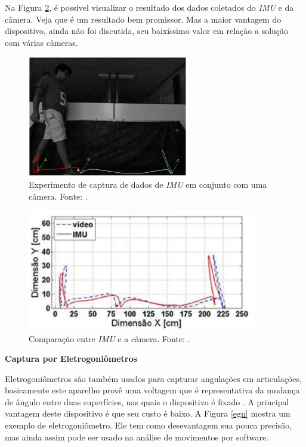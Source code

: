 Na Figura \ref{imu2}, é possível visualizar o resultado dos dados coletados do \emph{IMU} e da câmera. 
Veja que é um resultado bem promissor. 
Mas a maior vantagem do dispositivo, ainda não foi discutida, seu baixíssimo valor em relação a solução com várias câmeras.

\begin{figure}[H]
	\centering
	\includegraphics[width=7cm]{figuras/imu.eps}
	\caption{Experimento de captura de dados de \emph{IMU} em conjunto com uma câmera. Fonte: \cite{Leite2014}.}
	\label{imu}
	
\end{figure}


\begin{figure}[H]
	\centering
	\includegraphics[width=10cm]{figuras/imu2.eps}
	\caption{Comparação entre \emph{IMU} e a câmera. Fonte: \cite{Leite2014}.}
	\label{imu2}
	
\end{figure}



\textbf{Captura por Eletrogoniômetros}

\noindent
Eletrogoniômetros são também usados para capturar angulações em articulações, basicamente este aparelho provê uma voltagem que é representativa da mudança de ângulo entre duas superfícies, nas quais o dispositivo é fixado \cite{K.Ibrahim2012}. 
A principal vantagem deste dispositivo é que seu custo é baixo. A Figura \ref{egn} mostra um exemplo de eletrogoniômetro.
Ele tem como desevantagem sua pouca precisão, mas ainda assim pode ser usado na análise de movimentos por software.



